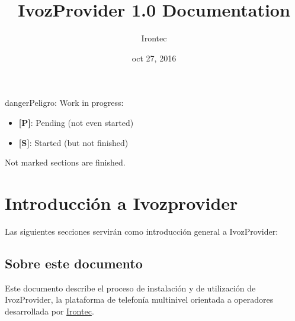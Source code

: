 \documentclass[letterpaper,10pt,spanish]{sphinxmanual}
\title{IvozProvider 1.0 Documentation}
\date{oct 27, 2016}
\author{Irontec}
\begin{document}
\maketitle
\tableofcontents
{}\label{index::doc}
\begin{notice}{danger}{Peligro:}
Work in progress:
\begin{itemize}
\item {} 
\textbf{{[}P{]}}: Pending (not even started)

\item {} 
\textbf{{[}S{]}}: Started (but not finished)

\end{itemize}

Not marked sections are finished.
\end{notice}




\chapter{Introducción a Ivozprovider}
\label{intro/index:documentacion-oficial-de-ivozprovider}\label{intro/index::doc}\label{intro/index:introduccion-a-ivozprovider}
Las siguientes secciones servirán como introducción general a IvozProvider:


\section{Sobre este documento}
\label{intro/about:sobre-este-documento}\label{intro/about::doc}
Este documento describe el proceso de instalación y de utilización de IvozProvider, la plataforma de telefonía multinivel orientada a operadores desarrollada por \href{http://irontec.com}{Irontec}.
\end{document}
